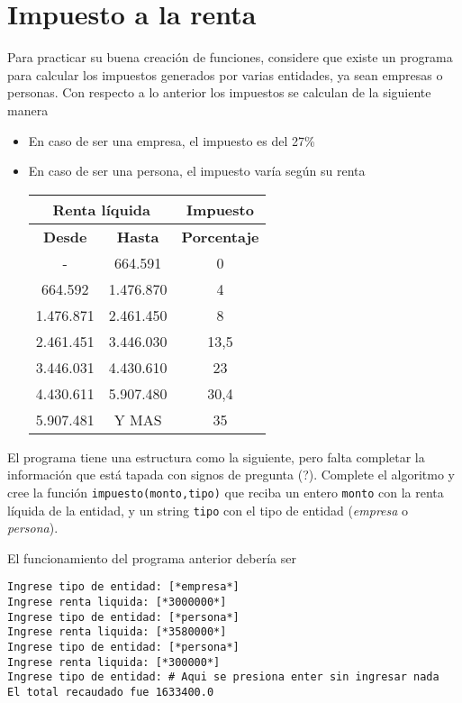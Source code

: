 \section{Impuesto a la renta}

Para practicar su buena creación de funciones, considere que existe un programa para calcular los impuestos generados por varias entidades, ya sean empresas o personas. Con respecto a lo anterior los impuestos se calculan de la siguiente manera
\begin{itemize}
    \item En caso de ser una empresa, el impuesto es del 27\%
    \item En caso de ser una persona, el impuesto varía según su renta
    \begin{table}[H]
\centering
\begin{tabular}{|c|c|c|}
\hline
\multicolumn{2}{|c|}{\textbf{Renta líquida}} & \textbf{Impuesto} \\ \hline
\textbf{Desde} & \textbf{Hasta} & \textbf{Porcentaje} \\ \hline
- & 664.591 & 0 \\ \hline
664.592 & 1.476.870 & 4 \\ \hline
1.476.871 & 2.461.450 & 8 \\ \hline
2.461.451 & 3.446.030 & 13,5 \\ \hline
3.446.031 & 4.430.610 & 23 \\ \hline
4.430.611 & 5.907.480 & 30,4 \\ \hline
5.907.481 & Y MAS & 35 \\ \hline
\end{tabular}
\end{table}
\end{itemize}

El programa tiene una estructura como la siguiente, pero falta completar la información que está tapada con signos de pregunta (?). Complete el algoritmo y cree la función \texttt{impuesto(monto,tipo)} que reciba un entero \texttt{monto} con la renta líquida de la entidad, y un string \texttt{tipo} con el tipo de entidad (\textit{empresa} o \textit{persona}).



El funcionamiento del programa anterior debería ser

\begin{lstlisting}[style=consola]
Ingrese tipo de entidad: [*empresa*]
Ingrese renta liquida: [*3000000*]
Ingrese tipo de entidad: [*persona*]
Ingrese renta liquida: [*3580000*]
Ingrese tipo de entidad: [*persona*]
Ingrese renta liquida: [*300000*]
Ingrese tipo de entidad: # Aqui se presiona enter sin ingresar nada 
El total recaudado fue 1633400.0
\end{lstlisting}